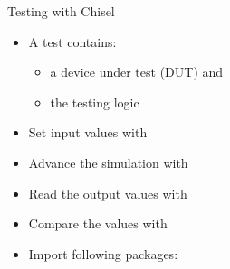 %
%


\begin{frame}[fragile]{Testing with Chisel}
\begin{itemize}
\item A test contains:
\begin{itemize}
\item a device under test (DUT) and
\item the testing logic
\end{itemize}
\item Set input values with 
\item Advance the simulation with 
\item Read the output values with 
\item Compare the values with 
\item Import following packages:
\end{itemize}
\end{frame}

